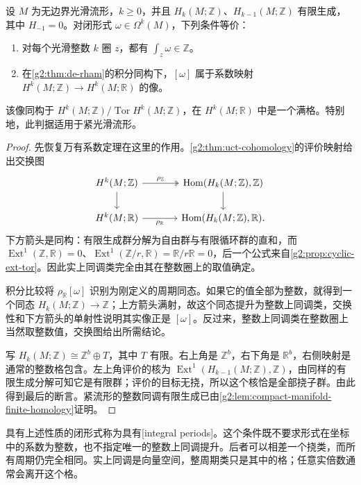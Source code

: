 \begin{proposition}\label{g2:prop:integral-periods}
	设 \(M\) 为无边界光滑流形，\(k\geq0\)，并且 \(H_k(M;\mathbb Z)\)、\(H_{k-1}(M;\mathbb Z)\) 有限生成，其中 \(H_{-1}=0\)。对闭形式 \(\omega\in\Omega^k(M)\)，下列条件等价：
	\begin{enumerate}
		\item 对每个光滑整数 \(k\) 圈 \(z\)，都有 \(\int_z\omega\in\mathbb Z\)。
		\item 在\cref{g2:thm:de-rham}的积分同构下，\([\omega]\) 属于系数映射 \(H^k(M;\mathbb Z)\to H^k(M;\mathbb R)\) 的像。
	\end{enumerate}
	该像同构于 \(H^k(M;\mathbb Z)/\operatorname{Tor}H^k(M;\mathbb Z)\)，在 \(H^k(M;\mathbb R)\) 中是一个满格。特别地，此判据适用于紧光滑流形。
\end{proposition}
\begin{proof}
	先恢复万有系数定理在这里的作用。\cref{g2:thm:uct-cohomology}的评价映射给出交换图
	\[
		\begin{tikzcd}[column sep=large]
			H^k(M;\mathbb Z) \arrow[r,two heads,"\rho_{\mathbb Z}"] \arrow[d] & \operatorname{Hom}(H_k(M;\mathbb Z),\mathbb Z) \arrow[d] \\
			H^k(M;\mathbb R) \arrow[r,"\rho_{\mathbb R}"'] & \operatorname{Hom}(H_k(M;\mathbb Z),\mathbb R).
		\end{tikzcd}
	\]
	下方箭头是同构：有限生成群分解为自由群与有限循环群的直和，而 \(\operatorname{Ext}^1(\mathbb Z,\mathbb R)=0\)、\(\operatorname{Ext}^1(\mathbb Z/r,\mathbb R)=\mathbb R/r\mathbb R=0\)，后一个公式来自\cref{g2:prop:cyclic-ext-tor}。因此实上同调类完全由其在整数圈上的取值确定。

	积分比较将 \(\rho_{\mathbb R}[\omega]\) 识别为刚定义的周期同态。如果它的值全部为整数，就得到一个同态 \(H_k(M;\mathbb Z)\to\mathbb Z\)；上方箭头满射，故这个同态提升为整数上同调类，交换性和下方箭头的单射性说明其实像正是 \([\omega]\)。反过来，整数上同调类在整数圈上当然取整数值，交换图给出所需结论。

	写 \(H_k(M;\mathbb Z)\cong\mathbb Z^b\oplus T\)，其中 \(T\) 有限。右上角是 \(\mathbb Z^b\)，右下角是 \(\mathbb R^b\)，右侧映射是通常的整数格包含。左上角评价的核为 \(\operatorname{Ext}^1(H_{k-1}(M;\mathbb Z),\mathbb Z)\)，由同样的有限生成分解可知它是有限群；评价的目标无挠，所以这个核恰是全部挠子群。由此得到最后的断言。紧流形的整数同调有限生成已由\cref{g2:lem:compact-manifold-finite-homology}证明。
\end{proof}

具有上述性质的闭形式称为具有[integral periods]。这个条件既不要求形式在坐标中的系数为整数，也不指定唯一的整数上同调提升。后者可以相差一个挠类，而所有周期仍完全相同。实上同调是向量空间，整周期类只是其中的格；任意实倍数通常会离开这个格。

